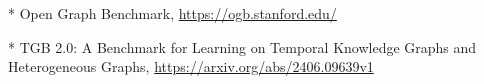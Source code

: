 


* Open Graph Benchmark, 
\url{https://ogb.stanford.edu/}

* TGB 2.0: A Benchmark for Learning on Temporal Knowledge Graphs and Heterogeneous Graphs, \url{https://arxiv.org/abs/2406.09639v1} 
